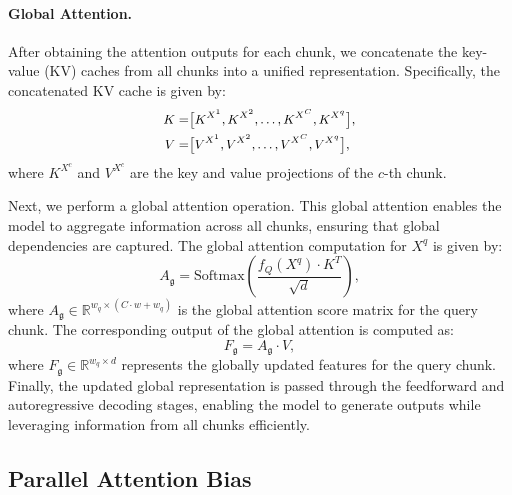 \paragraph{Global Attention.}  

After obtaining the attention outputs for each chunk, we concatenate the key-value (KV) caches from all chunks into a unified representation. Specifically, the concatenated KV cache is given by: 
\begin{equation}
\small
\begin{aligned}
K =& \big[K^{X^1}, K^{X^2}, \dots, K^{X^C}, K^{X^q}\big], \\
V =& \big[V^{X^1}, V^{X^2}, \dots, V^{X^C}, V^{X^q}\big],
\end{aligned}
\end{equation}
where \( K^{X^c} \) and \( V^{X^c} \) are the key and value projections of the \( c \)-th chunk.


Next, we perform a global attention operation. This global attention enables the model to aggregate information across all chunks, ensuring that global dependencies are captured. The global attention computation for \( X^q \) is given by:
\begin{equation}
A_{\mathfrak{g}} = \text{Softmax}\left(\frac{f_Q(X^q) \cdot K^T}{\sqrt{d}}\right),
\end{equation}
where \( A_{\mathfrak{g}} \in \mathbb{R}^{w_q \times (C \cdot w + w_q)} \) is the global attention score matrix for the query chunk. The corresponding output of the global attention is computed as:
\begin{equation}
F_{\mathfrak{g}} = A_{\mathfrak{g}} \cdot V,
\end{equation}
where \( F_{\mathfrak{g}} \in \mathbb{R}^{w_q \times d} \) represents the globally updated features for the query chunk. Finally, the updated global representation is passed through the feedforward and autoregressive decoding stages, enabling the model to generate outputs while leveraging information from all chunks efficiently.














% 
\vspace{-1mm}
\subsection{Parallel Attention Bias}
\label{Parallel Attention Bias}



